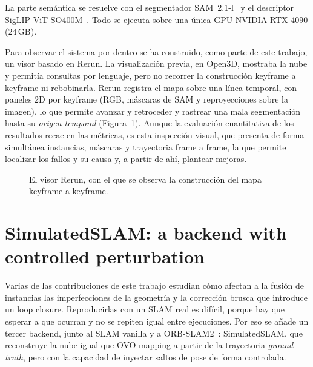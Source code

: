 La parte semántica se resuelve con el segmentador SAM~2.1-l~\parencite{ravi2024sam2} y el
descriptor SigLIP ViT-SO400M~\parencite{zhai2023siglip}. Todo se ejecuta sobre una única GPU
NVIDIA RTX 4090 (24\,GB).

Para observar el sistema por dentro se ha construido, como parte de este trabajo, un visor
basado en Rerun. La visualización previa, en Open3D, mostraba la nube y permitía consultas por
lenguaje, pero no recorrer la construcción keyframe a keyframe ni rebobinarla. Rerun registra
el mapa sobre una línea temporal, con paneles 2D por keyframe (RGB, máscaras de SAM y
reproyecciones sobre la imagen), lo que permite avanzar y retroceder y rastrear una mala
segmentación hasta su \emph{origen temporal} (Figura~\ref{fig:rerun_tracking}). Aunque la evaluación
cuantitativa de los resultados recae en las métricas, es esta inspección visual, que presenta
de forma simultánea instancias, máscaras y trayectoria frame a frame, la que permite localizar
los fallos y su causa y, a partir de ahí, plantear mejoras.

\begin{figure}[H]
  \centering
  \caption{El visor Rerun, con el que se observa la construcción del mapa keyframe a keyframe.}
  \label{fig:rerun_tracking}
\end{figure}

\section{SimulatedSLAM: a backend with controlled perturbation}
\label{sec:bench_simslam}

Varias de las contribuciones de este trabajo estudian cómo afectan a la fusión de instancias
las imperfecciones de la geometría y la corrección brusca que introduce un loop closure.
Reproducirlas con un SLAM real es difícil, porque hay que esperar a que ocurran y no se
repiten igual entre ejecuciones. Por eso se añade un tercer backend, junto
al SLAM vanilla y a ORB-SLAM2~\parencite{murartal2017orbslam2}: SimulatedSLAM, que reconstruye la nube igual que
OVO-mapping a partir de la trayectoria \emph{ground truth}, pero con la capacidad de inyectar
saltos de pose de forma controlada.

